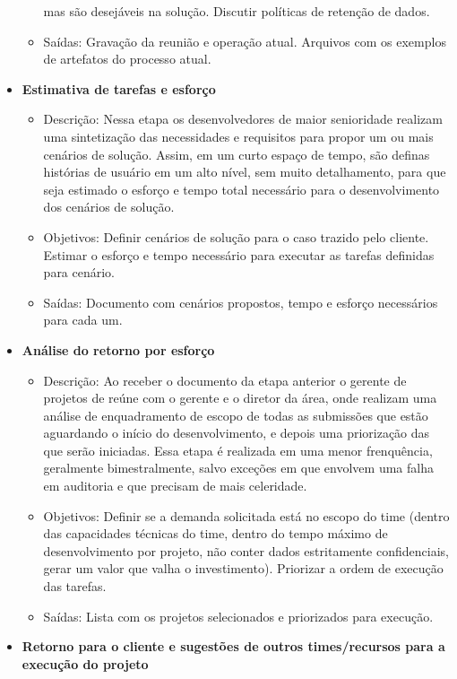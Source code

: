 \begin{itemize}
\begin{itemize}
			mas são desejáveis na solução. Discutir políticas de retenção de dados.
			\item Saídas: Gravação da reunião e operação atual. Arquivos com os exemplos de artefatos do processo atual.
		\end{itemize}
		\item \textbf{Estimativa de tarefas e esforço}
		\begin{itemize}
			\item Descrição: Nessa etapa os desenvolvedores de maior senioridade realizam uma sintetização das necessidades e requisitos para propor
			um ou mais cenários de solução. Assim, em um curto espaço de tempo, são definas histórias de usuário em um alto nível, sem muito detalhamento,
			para que seja estimado o esforço e tempo total necessário para o desenvolvimento dos cenários de solução. 
			\item Objetivos: Definir cenários de solução para o caso trazido pelo cliente. Estimar o esforço e tempo necessário para executar as tarefas definidas para cenário.
			\item Saídas: Documento com cenários propostos, tempo e esforço necessários para cada um. 
		\end{itemize}
		\item \textbf{Análise do retorno por esforço}
		\begin{itemize}
			\item Descrição: Ao receber o documento da etapa anterior o gerente de projetos de reúne com o gerente e o diretor da área,
			onde realizam uma análise de enquadramento de escopo de todas as submissões que estão aguardando o início do desenvolvimento, e 
			depois uma priorização das que serão iniciadas. Essa etapa é realizada em uma menor frenquência,
			geralmente bimestralmente, salvo exceções em que envolvem uma falha em auditoria e que precisam de mais celeridade.
			\item Objetivos: Definir se a demanda solicitada está no escopo do time (dentro das capacidades técnicas do time, dentro do tempo máximo de desenvolvimento por projeto, não conter
			dados estritamente confidenciais, gerar um valor que valha o investimento). Priorizar a ordem de execução das tarefas.
			\item Saídas: Lista com os projetos selecionados e priorizados para execução.
		\end{itemize}
		\item \textbf{Retorno para o cliente e sugestões de outros times/recursos para a execução do projeto}
		\begin{itemize}

\end{itemize}
\end{itemize}
